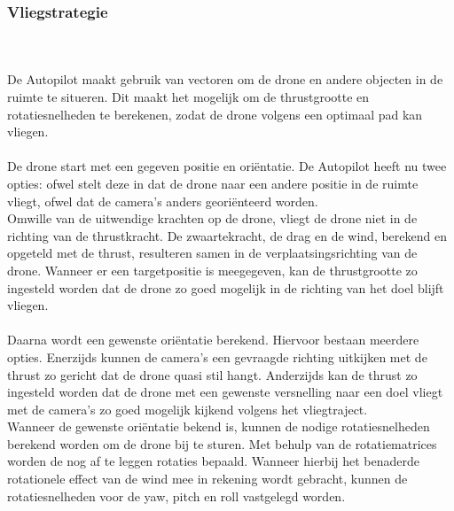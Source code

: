 \subsubsection{Vliegstrategie}
\\
\\
De Autopilot maakt gebruik van vectoren om de drone en andere objecten in de ruimte te situeren. Dit maakt het mogelijk om de thrustgrootte en rotatiesnelheden te berekenen, zodat de drone volgens een optimaal pad kan vliegen.
\\
\\
De drone start met een gegeven positie en ori\"entatie. De Autopilot heeft nu twee opties: ofwel stelt deze in dat de drone naar een andere positie in de ruimte vliegt, ofwel dat de camera's anders geori\"enteerd worden.
\\
Omwille van de uitwendige krachten op de drone, vliegt de drone niet in de richting van de thrustkracht. De zwaartekracht, de drag en de wind, berekend en opgeteld met de thrust, resulteren samen in de verplaatsingsrichting van de drone. Wanneer er een targetpositie is meegegeven, kan de thrustgrootte zo ingesteld worden dat de drone zo goed mogelijk in de richting van het doel blijft vliegen.
\\
\\
Daarna wordt een gewenste ori\"entatie berekend. Hiervoor bestaan meerdere opties. Enerzijds kunnen de camera's een gevraagde richting uitkijken met de thrust zo gericht dat de drone quasi stil hangt. Anderzijds kan de thrust zo ingesteld worden dat de drone met een gewenste versnelling naar een doel vliegt met de camera's zo goed mogelijk kijkend volgens het vliegtraject.
\\
Wanneer de gewenste ori\"entatie bekend is, kunnen de nodige rotatiesnelheden berekend worden om de drone bij te sturen. Met behulp van de rotatiematrices worden de nog af te leggen rotaties bepaald. Wanneer hierbij het benaderde rotationele effect van de wind mee in rekening wordt gebracht, kunnen de rotatiesnelheden voor de yaw, pitch en roll vastgelegd worden.